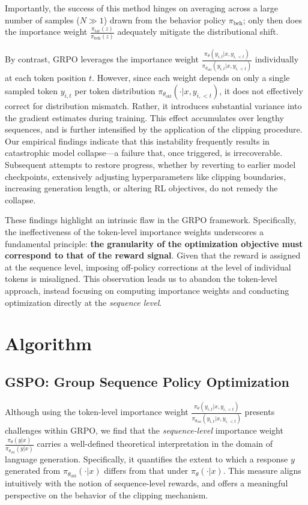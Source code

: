 Importantly, the success of this method hinges on averaging across a large number of samples ($N \gg 1$) drawn from the behavior policy $\pi_\text{beh}$; only then does the importance weight $\frac{ \pi_\text{tar} (z) }{ \pi_\text{beh} (z)}$ adequately mitigate the distributional shift.

By contrast, GRPO leverages the importance weight $\frac{ \pi_{\theta} (y_{i,t} | x, y_{i,<t}) }{ \pi_{\theta_\text{old}} (y_{i,t} | x,y_{i,<t})}$ individually at each token position $t$. However, since each weight depends on only a single sampled token $y_{i,t}$ per token distribution $\pi_{\theta_\text{old}}( \cdot | x, y_{i, <t})$, it does not effectively correct for distribution mismatch. Rather, it introduces substantial variance into the gradient estimates during training. This effect accumulates over lengthy sequences, and is further intensified by the application of the clipping procedure. Our empirical findings indicate that this instability frequently results in catastrophic model collapse—a failure that, once triggered, is irrecoverable. Subsequent attempts to restore progress, whether by reverting to earlier model checkpoints, extensively adjusting hyperparameters like clipping boundaries, increasing generation length, or altering RL objectives, do not remedy the collapse.

These findings highlight an intrinsic flaw in the GRPO framework. Specifically, the ineffectiveness of the token-level importance weights underscores a fundamental principle: \textbf{the granularity of the optimization objective must correspond to that of the reward signal}. Given that the reward is assigned at the sequence level, imposing off-policy corrections at the level of individual tokens is misaligned. This observation leads us to abandon the token-level approach, instead focusing on computing importance weights and conducting optimization directly at the \textit{sequence level}.

\section{Algorithm}

\subsection{GSPO: Group Sequence Policy Optimization}

Although using the token-level importance weight $\frac{ \pi_{\theta} (y_{i,t} | x, y_{i,<t}) }{ \pi_{\theta_\text{old}} (y_{i,t} | x, y_{i,<t})}$ presents challenges within GRPO, we find that the \textit{sequence-level} importance weight $\frac{ \pi_{\theta} (y | x) }{ \pi_{\theta_\text{old}} (y | x)}$ carries a well-defined theoretical interpretation in the domain of language generation. Specifically, it quantifies the extent to which a response $y$ generated from $\pi_{\theta_\text{old}} (\cdot | x)$ differs from that under $\pi_{\theta} (\cdot | x)$. This measure aligns intuitively with the notion of sequence-level rewards, and offers a meaningful perspective on the behavior of the clipping mechanism.

